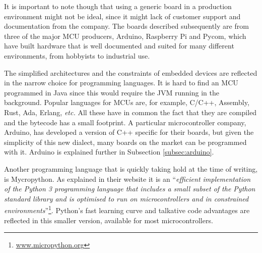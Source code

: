 		It is important to note though that using a generic board in a production environment might not be ideal, since it might lack of customer support and documentation from the company.
		The boards described subsequently are from three of the major MCU producers, Arduino, Raspberry Pi and Pycom, which have built hardware that is well documented and suited for many different environments, from hobbyists to industrial use.
		
		The simplified architectures and the constraints of embedded devices are reflected in the narrow choice for programming languages.
		It is hard to find an MCU programmed in Java since this would require the JVM running in the background.
		Popular languages for MCUs are, for example, C/C++, Assembly, Rust, Ada, Erlang, \textit{etc.}
		All these have in common the fact that they are compiled and the bytecode has a small footprint.
		A particular microcontroller company, Arduino, has developed a version of C++ specific for their boards, but given the simplicity of this new dialect, many boards on the market can be programmed with it.
		Arduino is explained further in Subsection \ref{subsec:arduino}.
	
		Another programming language that is quickly taking hold at the time of writing, is Mycropython.
		As explained in their website it is an ``\textit{efficient implementation of the Python 3 programming language that includes a small subset of the Python standard library and is optimised to run on microcontrollers and in constrained environments}''\footnote{ \url{www.micropython.org}}.
		Python's fast learning curve and talkative code advantages are reflected in this smaller version, available for most microcontrollers.
		
	
